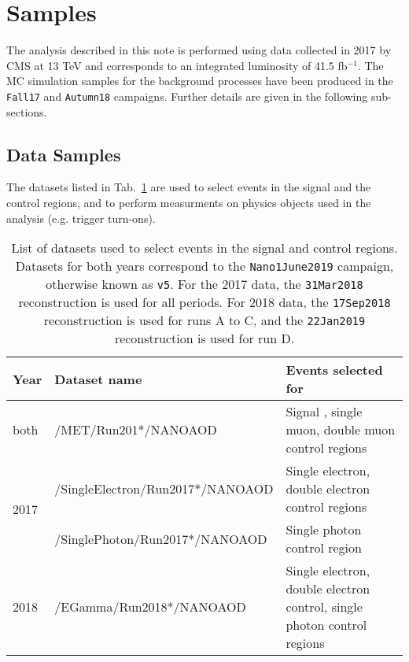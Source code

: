 \section{Samples} \label{sec:samples}

The analysis described in this note is performed using data collected in 2017 by
CMS at 13 TeV and corresponds to an integrated luminosity of 41.5 fb$^{-1}$.
The MC simulation samples for the background processes
have been produced in the \texttt{Fall17} and \texttt{Autumn18} campaigns. Further details
are given in the following sub-sections.

\subsection{Data Samples}

The datasets listed in Tab.~\ref{tab:DataSamples} are used to
select events in the signal and the control regions, and to perform measurments on physics objects
used in the analysis (e.g. trigger turn-ons).

\begin{table}[ht!]
    \centering
    \small
    \def\arraystretch{1.5}
    \caption{List of datasets used to select events in the signal and control regions. Datasets for both years correspond to the \texttt{Nano1June2019} campaign, otherwise known as \texttt{v5}. For the 2017 data, the \texttt{31Mar2018} reconstruction is used for all periods. For 2018 data, the \texttt{17Sep2018} reconstruction is used for runs A to C, and the \texttt{22Jan2019} reconstruction is used for run D.}
    \begin{tabular}{l l p{8cm}}
        \hline
        \hline
        Year                  & Dataset name                       & Events selected for                                                     \\
        \hline
        \hline
        both                  & {/MET/Run201*/NANOAOD}             & Signal , single muon, double muon control regions                 \\\hline
        \multirow{2}{*}{2017} & {/SingleElectron/Run2017*/NANOAOD} & Single electron, double electron control regions                        \\
                              & {/SinglePhoton/Run2017*/NANOAOD}   & Single photon control region                                            \\\hline
        2018                  & {/EGamma/Run2018*/NANOAOD}         & Single electron, double electron control, single photon control regions \\
        \hline
        \hline
    \end{tabular}

    \label{tab:DataSamples}
\end{table}

